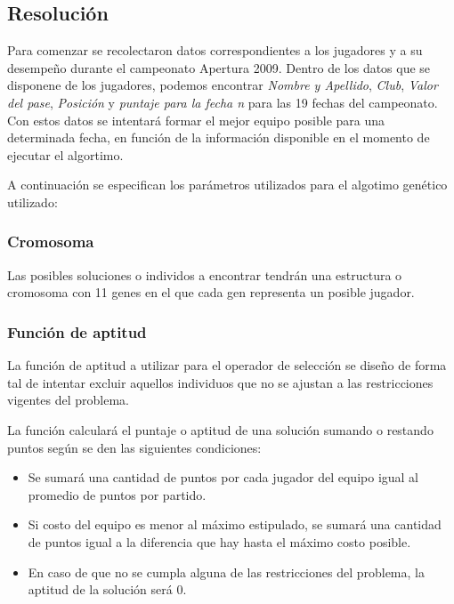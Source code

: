 \documentclass[pdftex,a4paper,10.5pt]{article}
\begin{document}
\subsection{Resoluci\'on}

Para comenzar se recolectaron datos correspondientes a los jugadores y a su desempe\~no durante el campeonato Apertura 2009. Dentro de los datos que se disponene de los jugadores, podemos encontrar \textit{Nombre y Apellido}, \textit{Club}, \textit{Valor del pase}, \textit{Posici\'on} y \textit{puntaje para la fecha n} para las 19 fechas del campeonato. Con estos datos se intentar\'a formar el mejor equipo posible para una determinada fecha, en funci\'on de la informaci\'on disponible en el momento de ejecutar el algortimo.

A continuaci\'on se especifican los par\'ametros utilizados para el algotimo gen\'etico utilizado:

\subsubsection{Cromosoma}

Las posibles soluciones o individos a encontrar tendr\'an una estructura o cromosoma con 11 genes en el que cada gen representa un posible jugador.

\subsubsection{Funci\'on de aptitud}

La funci\'on de aptitud a utilizar para el operador de selecci\'on se dise\~no de forma tal de intentar excluir aquellos individuos que no se ajustan a las restricciones vigentes del problema.

La funci\'on calcular\'a el puntaje o aptitud de una soluci\'on sumando o restando puntos seg\'un se den las siguientes condiciones:

\begin{itemize}
\item Se sumar\'a una cantidad de puntos por cada jugador del equipo igual al promedio de puntos por partido.
\item Si costo del equipo es menor al m\'aximo estipulado, se sumar\'a una cantidad de puntos igual a la diferencia que hay hasta el m\'aximo costo posible.
\item En caso de que no se cumpla alguna de las restricciones del problema, la aptitud de la soluci\'on ser\'a 0.
\end{itemize}
\end{document}
